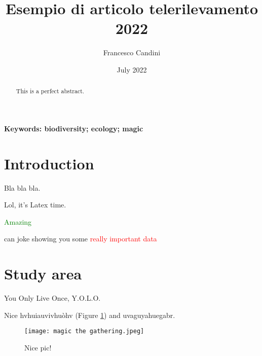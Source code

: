 \documentclass[a4paper, 12pt]{article} %
\title{Esempio di articolo telerilevamento 2022} %
\author{Francesco Candini} %
\date{July 2022} %
\newcommand{\tr}{\textcolor{red}} %
\begin{document}

\maketitle

\begin{abstract}
   \centering This is a perfect abstract. 
\end{abstract}

\noindent \textbf{Keywords:  biodiversity; ecology; magic} %

\tableofcontents %



\section{Introduction} \label{Sec.: Intro} %


Bla bla bla. %

Lol, it's Latex time. %

\bigskip{}

\textcolor{green}{Amazing}

 can joke showing you some \Large{\tr{really important data}}


\section{Study area}


\normalsize You Only Live Once, Y.O.L.O. 

Nice hvhuiauvivhuòhv (Figure \ref{Fig.: Magic}) and uvaguyahuegabr. %
\begin{figure}
 \texttt{[image: magic the gathering.jpeg]} 
 \centering %
 \caption{Nice pic!} %
 \label{Fig.: Magic} %
\end{figure}
\end{document}
